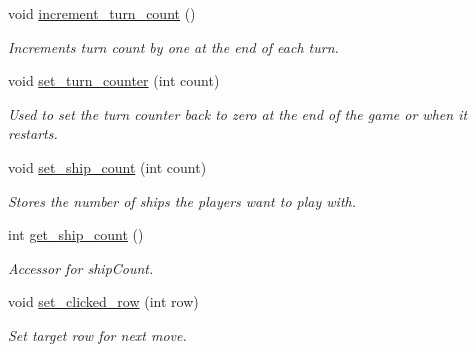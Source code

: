 \begin{DoxyCompactItemize}
\mbox{\label{classExecutive_a0240d3217edc59b481cd343ace98812d}} 
void \mbox{\hyperlink{classExecutive_a0240d3217edc59b481cd343ace98812d}{increment\+\_\+turn\+\_\+count}} ()
\begin{DoxyCompactList}\small\item\em Increments turn count by one at the end of each turn. \end{DoxyCompactList}\item 
\mbox{\label{classExecutive_ad5c7706649b878b05d2e2126196d117a}} 
void \mbox{\hyperlink{classExecutive_ad5c7706649b878b05d2e2126196d117a}{set\+\_\+turn\+\_\+counter}} (int count)
\begin{DoxyCompactList}\small\item\em Used to set the turn counter back to zero at the end of the game or when it restarts. \end{DoxyCompactList}\item 
\mbox{\label{classExecutive_a1043133ae18fbe569ddc8da0cb122500}} 
void \mbox{\hyperlink{classExecutive_a1043133ae18fbe569ddc8da0cb122500}{set\+\_\+ship\+\_\+count}} (int count)
\begin{DoxyCompactList}\small\item\em Stores the number of ships the players want to play with. \end{DoxyCompactList}\item 
\mbox{\label{classExecutive_addfd4ad7c6794fb6ed00e87456c593ea}} 
int \mbox{\hyperlink{classExecutive_addfd4ad7c6794fb6ed00e87456c593ea}{get\+\_\+ship\+\_\+count}} ()
\begin{DoxyCompactList}\small\item\em Accessor for ship\+Count. \end{DoxyCompactList}\item 
\mbox{\label{classExecutive_aede4aaec377d04705c932cef1f0a995f}} 
void \mbox{\hyperlink{classExecutive_aede4aaec377d04705c932cef1f0a995f}{set\+\_\+clicked\+\_\+row}} (int row)
\begin{DoxyCompactList}\small\item\em Set target row for next move. \end{DoxyCompactList}\item 
\mbox{\label{classExecutive_a2e5f0cb131520db0229bbe5084cef3bc}} 

\end{DoxyCompactItemize}
